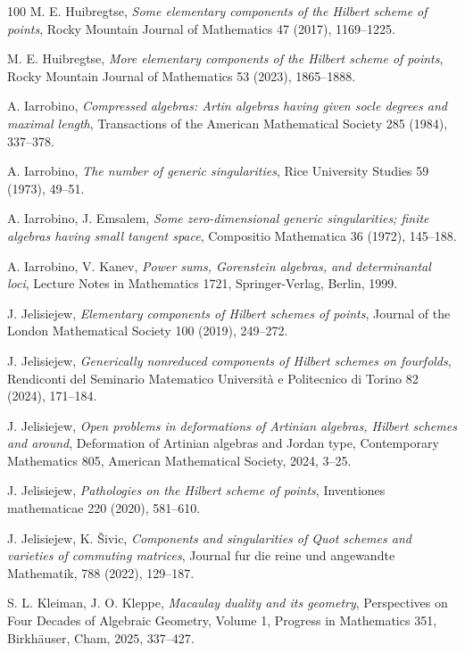 \documentclass[11pt]{amsart}
\theoremstyle{definition}
\begin{document}
\begin{thebibliography}{100}
M. E. Huibregtse, {\em Some elementary components of the Hilbert scheme of points}, Rocky Mountain Journal of Mathematics 47 (2017), 1169--1225.

M. E. Huibregtse, {\em More elementary components of the Hilbert scheme of points}, Rocky Mountain Journal of Mathematics 53 (2023), 1865--1888.

A. Iarrobino, {\em Compressed algebras: Artin algebras having given socle degrees and maximal length}, Transactions of the American Mathematical Society 285 (1984), 337--378.

A. Iarrobino, {\em The number of generic singularities}, Rice University Studies 59 (1973), 49--51.

A. Iarrobino, J. Emsalem, {\em Some zero-dimensional generic singularities; finite algebras having small tangent space}, Compositio Mathematica 36 (1972), 145--188.

A. Iarrobino, V. Kanev, {\em Power sums, Gorenstein algebras, and determinantal loci}, Lecture Notes in Mathematics 1721, Springer-Verlag, Berlin, 1999.

J. Jelisiejew, {\em Elementary components of Hilbert schemes of points}, Journal of the London Mathematical Society 100 (2019), 249--272.

J. Jelisiejew, {\em Generically nonreduced components of Hilbert schemes on fourfolds}, Rendiconti del Seminario Matematico Università e Politecnico di Torino 82 (2024), 171--184.

J. Jelisiejew, {\em Open problems in deformations of Artinian algebras, Hilbert schemes and around}, Deformation of Artinian algebras and Jordan type, Contemporary Mathematics 805, American Mathematical Society, 2024, 3--25.

J. Jelisiejew, {\em  Pathologies on the Hilbert scheme of points}, Inventiones mathematicae 220 (2020), 581--610.

J. Jelisiejew, K. Šivic, {\em Components and singularities of Quot schemes and varieties of commuting matrices}, Journal fur die reine und angewandte Mathematik, 788 (2022), 129--187.

S. L. Kleiman, J. O. Kleppe, {\em Macaulay duality and its geometry},  Perspectives on Four Decades of Algebraic Geometry, Volume 1, Progress in Mathematics 351, Birkhäuser, Cham, 2025, 337--427.


\end{thebibliography}
\end{document}

